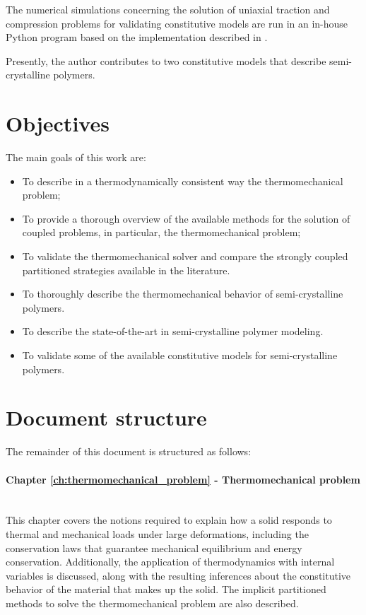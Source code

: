 The numerical simulations concerning the solution of uniaxial traction and compression problems for validating constitutive models are run in an in-house Python program based on the implementation described in \cite{bergstromMechanicsSolidPolymers2015}.

Presently, the author contributes to two constitutive models that describe semi-crystalline polymers.

\section{Objectives}

The main goals of this work are:
\begin{itemize}
    \item To describe in a thermodynamically consistent way the thermomechanical problem;
    \item To provide a thorough overview of the available methods for the solution of coupled problems, in particular, the thermomechanical problem;
    \item To validate the thermomechanical solver and compare the strongly coupled partitioned strategies available in the literature.
    \item To thoroughly describe the thermomechanical behavior of semi-crystalline polymers.
    \item To describe the state-of-the-art in semi-crystalline polymer modeling.
    \item To validate some of the available constitutive models for semi-crystalline polymers.
\end{itemize}

\section{Document structure}

The remainder of this document is structured as follows:

\paragraph{Chapter \ref{ch:thermomechanical_problem} - Thermomechanical problem}\mbox{}\\
This chapter covers the notions required to explain how a solid responds to thermal and mechanical loads under large deformations, including the conservation laws that guarantee mechanical equilibrium and energy conservation.
Additionally, the application of thermodynamics with internal variables is discussed, along with the resulting inferences about the constitutive behavior of the material that makes up the solid.
The implicit partitioned methods to solve the thermomechanical problem are also described.

